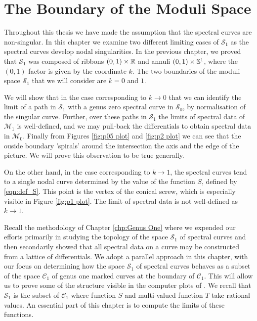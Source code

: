 
\chapter{The Boundary of the Moduli Space}
\label{chp:Moduli Boundary}

Throughout this thesis we have made the assumption that the spectral curves are non-singular. In this chapter we examine two different limiting cases of $\mathcal{S}_1$ as the spectral curves develop nodal singularities.
In the previous chapter, we proved that $\mathcal{S}_1$ was composed of ribbons $(0,1)\times \R$ and annuli $(0,1) \times \S^1$, where the $(0,1)$ factor is given by the coordinate $k$. The two boundaries of the moduli space $\mathcal{S}_1$ that we will consider are $k=0$ and $1$.

We will show that in the case corresponding to $k \to 0$ that we can identify the limit of a path in $\mathcal{S}_1$ with a genus zero spectral curve in $\mathcal{S}_0$, by normalisation of the singular curve. Further, over these paths in $\mathcal{S}_1$ the limits of spectral data of $\mathcal{M}_1$ is well-defined, and we may pull-back the differentials to obtain spectral data in $\mathcal{M}_0$. Finally from Figures \ref{fig:p05 plot} and \ref{fig:p2 plot} we can see that the ouside boundary 'spirals' around the intersection the axis and the edge of the picture. We will prove this observation to be true generally.

On the other hand, in the case corresponding to $k \to 1$, the spectral curves tend to a single nodal curve determined by the value of the function $S$, defined by \eqref{eqn:def_S}. This point is the vertex of the conical screw, which is especially visible in Figure \ref{fig:p1 plot}. The limit of spectral data is not well-defined as $k \to 1$.

Recall the methodology of Chapter \ref{chp:Genus One} where we expended our efforts primarily in studying the topology of the space $\mathcal{S}_1$ of spectral curves and then secondarily showed that all spectral data on a curve may be constructed from a lattice of differentials.
We adopt a parallel approach in this chapter, with our focus on determining how the space $\mathcal{S}_1$ of spectral curves behaves as a subset of the space $\mathcal{C}_1$ of genus one marked curves at the boundary of $\mathcal{C}_1$. This will allow us to prove some of the structure visible in the computer plots of .
We recall that $\mathcal{S}_1$ is the subset of $\mathcal{C}_1$ where function $S$ and multi-valued function $T$ take rational values. An essential part of this chapter is to compute the limits of these functions.


